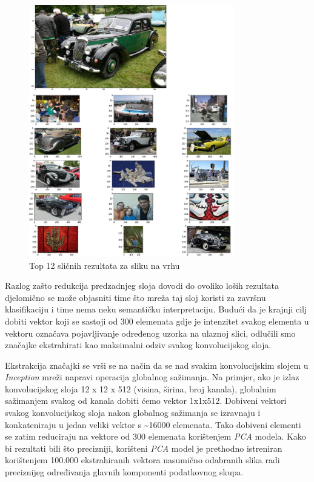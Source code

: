 \documentclass[times, utf8, proizvoljni, numeric]{fer}
\begin{document}
\begin{figure}[H]
	\begin{center}
		\captionsetup{justification=centering}
		\includegraphics[width=0.8\textwidth]{./imgs/inception_zadnji_sloj_auti_greska.png}
		\caption{Top 12 sličnih rezultata za sliku na vrhu}
		\label{fg:inception_zadnji_sloj_auti_greska}
	\end{center}
\end{figure}

Razlog zašto redukcija predzadnjeg sloja dovodi do ovoliko loših rezultata djelomično se može objasniti time što mreža taj sloj koristi za završnu klasifikaciju i time nema neku semantičku interpretaciju. Budući da je krajnji cilj dobiti vektor koji se sastoji od 300 elemenata gdje je intenzitet svakog elementa u vektoru označava pojavljivanje određenog uzorka na ulaznoj slici, odlučili smo značajke ekstrahirati kao maksimalni odziv svakog konvolucijskog sloja. 

Ekstrakcija značajki se vrši se na način da se nad svakim konvolucijskim slojem u \textit{Inception} mreži napravi operacija globalnog sažimanja. Na primjer, ako je izlaz konvolucijskog sloja 12 x 12 x 512 (visina, širina, broj kanala), globalnim sažimanjem svakog od kanala dobiti ćemo vektor 1x1x512. Dobiveni vektori svakog konvolucijskog sloja nakon globalnog sažimanja se izravnaju i konkateniraju u jedan veliki vektor s  \textasciitilde16000 elemenata.  Tako dobiveni elementi se zatim reduciraju na vektore od 300 elemenata korištenjem \textit{PCA} modela. Kako bi rezultati bili što precizniji, korišteni \textit{PCA} model je prethodno istreniran korištenjem 100.000 ekstrahiranih vektora nasumično odabranih slika radi preciznijeg određivanja glavnih komponenti podatkovnog skupa.
\end{document}
